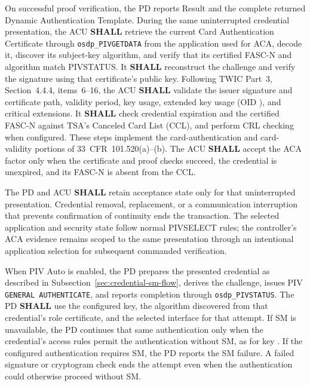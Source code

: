 On successful proof verification, the PD reports Result  and the
complete returned Dynamic Authentication Template. During the same uninterrupted
credential presentation, the ACU \textbf{SHALL} retrieve the current Card
Authentication Certificate through \texttt{osdp\_PIVGETDATA} from the
application used for ACA, decode it, discover its subject-key algorithm, and
verify that its certified FASC-N and algorithm match PIVSTATUS. It \textbf{SHALL}
reconstruct the challenge and verify the signature using that certificate's
public key. Following TWIC Part~3, Section~4.4.4, items~6--16, the ACU
\textbf{SHALL} validate the issuer signature and certificate path, validity period,
 key usage,  extended key usage
(OID ), and critical extensions. It \textbf{SHALL}
check credential expiration and the certified FASC-N against TSA's Canceled Card
List (CCL), and perform CRL checking when configured. These steps implement the
card-authentication and card-validity portions of 33~CFR~101.520(a)--(b).
The ACU \textbf{SHALL} accept the ACA factor only when the certificate and proof
checks succeed, the credential is unexpired, and its FASC-N is absent from the CCL.

The PD and ACU \textbf{SHALL} retain acceptance state only for that uninterrupted
presentation. Credential removal, replacement, or a communication interruption
that prevents confirmation of continuity ends the transaction. The selected
application and security state follow normal PIVSELECT rules; the controller's
ACA evidence remains scoped to the same presentation through an intentional
application selection for subsequent commanded verification.

When PIV Auto is enabled, the PD prepares the presented credential as described
in Subsection~\ref{sec:credential-sm-flow}, derives the challenge, issues PIV
\texttt{GENERAL AUTHENTICATE}, and reports completion through
\texttt{osdp\_PIVSTATUS}. The PD \textbf{SHALL} use the configured key,
the algorithm discovered from that credential's role certificate, and the selected interface
for that attempt. If SM is unavailable, the
PD continues that same authentication only when the credential's access rules permit
the authentication without SM, as for key . If the configured
authentication requires SM, the PD reports the SM failure. A failed signature
or cryptogram check ends the attempt even when the authentication could
otherwise proceed without SM.

